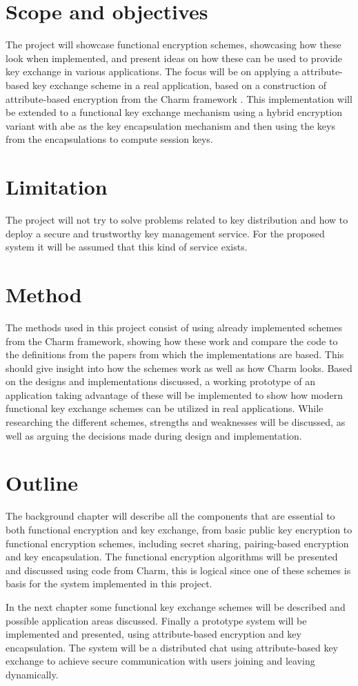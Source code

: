 \section{Scope and objectives}\label{sec:scope}

The project will showcase functional encryption schemes, showcasing how these look when implemented, and present ideas on how these can be used to provide key exchange in various applications. The focus will be on applying a attribute-based key exchange scheme in a real application, based on a construction of attribute-based encryption from the Charm framework \cite{DBLP:Charm13}. This implementation will be extended to a functional key exchange mechanism using a hybrid encryption variant with \gls{abe} as the key encapsulation mechanism and then using the keys from the encapsulations to compute session keys.


\section{Limitation}\label{sec:limitations}
The project will not try to solve problems related to key distribution and how to deploy a secure and trustworthy key management service. For the proposed system it will be assumed that this kind of service exists.

\section{Method}
The methods used in this project consist of using already implemented schemes from the Charm framework, showing how these work and compare the code to the definitions from the papers from which the implementations are based. This should give insight into how the schemes work as well as how Charm looks. Based on the designs and implementations discussed, a working prototype of an application taking advantage of these will be implemented to show how modern functional key exchange schemes can be utilized in real applications. While researching the different schemes, strengths and weaknesses will be discussed, as well as arguing the decisions made during design and implementation.


\section{Outline}\label{sec:outline}
The background chapter will describe all the components that are essential to both functional encryption and key exchange, from basic public key encryption to functional encryption schemes, including secret sharing, pairing-based encryption and key encapsulation. The functional encryption algorithms will be presented and discussed using code from Charm, this is logical since one of these schemes is basis for the system implemented in this project. 
\par In the next chapter some functional key exchange schemes will be described and possible application areas discussed. Finally a prototype system will be implemented and presented, using attribute-based encryption and key encapsulation. The system will be a distributed chat using attribute-based key exchange to achieve secure communication with users joining and leaving dynamically.
